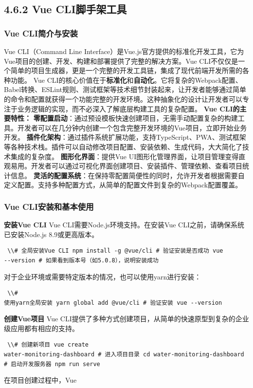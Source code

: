 \subsection{4.6.2 Vue CLI脚手架工具}\label{vue-cliux811aux624bux67b6ux5de5ux5177} \subsubsection{Vue
CLI简介与安装}\label{vue-cliux7b80ux4ecbux4e0eux5b89ux88c5} Vue CLI（Command Line
Interface）是Vue.js官方提供的标准化开发工具，它为Vue项目的创建、开发、构建和部署提供了完整的解决方案。Vue CLI不仅仅是一个简单的项目生成器，更是一个完整的开发工具链，集成了现代前端开发所需的各种功能。 Vue
CLI的核心价值在于\textbf{标准化}和\textbf{自动化}。它将复杂的Webpack配置、Babel转换、ESLint规则、测试框架等技术细节封装起来，让开发者能够通过简单的命令和配置就获得一个功能完整的开发环境。这种抽象化的设计让开发者可以专注于业务逻辑的实现，而不必深入了解底层构建工具的复杂配置。
\textbf{Vue CLI的主要特性：} \textbf{零配置启动}：通过预设模板快速创建项目，无需手动配置复杂的构建工具。开发者可以在几分钟内创建一个包含完整开发环境的Vue项目，立即开始业务开发。
\textbf{插件化架构}：通过插件系统扩展功能，支持TypeScript、PWA、测试框架等各种技术栈。插件可以自动修改项目配置、安装依赖、生成代码，大大简化了技术集成的复杂度。 \textbf{图形化界面}：提供Vue
UI图形化管理界面，让项目管理变得直观易用。开发者可以通过可视化界面创建项目、安装插件、管理依赖、查看项目统计信息。
\textbf{灵活的配置系统}：在保持零配置简便性的同时，允许开发者根据需要自定义配置。支持多种配置方式，从简单的配置文件到复杂的Webpack配置覆盖。 \subsubsection{Vue
CLI安装和基本使用}\label{vue-cliux5b89ux88c5ux548cux57faux672cux4f7fux7528} \textbf{安装Vue CLI} Vue CLI需要Node.js环境支持。在安装Vue
CLI之前，请确保系统已安装Node.js 8.9或更高版本。 \begin{lstlisting} \\# 全局安装Vue CLI npm install -g @vue/cli # 验证安装是否成功 vue
--version # 如果看到版本号（如5.0.8），说明安装成功 \end{lstlisting} 对于企业环境或需要特定版本的情况，也可以使用yarn进行安装： \begin{lstlisting} \\#
使用yarn全局安装 yarn global add @vue/cli # 验证安装 vue --version \end{lstlisting} \textbf{创建Vue项目} Vue
CLI提供了多种方式创建项目，从简单的快速原型到复杂的企业级应用都有相应的支持。 \begin{lstlisting} \\# 创建新项目 vue create
water-monitoring-dashboard # 进入项目目录 cd water-monitoring-dashboard # 启动开发服务器 npm run serve \end{lstlisting} 在项目创建过程中，Vue
